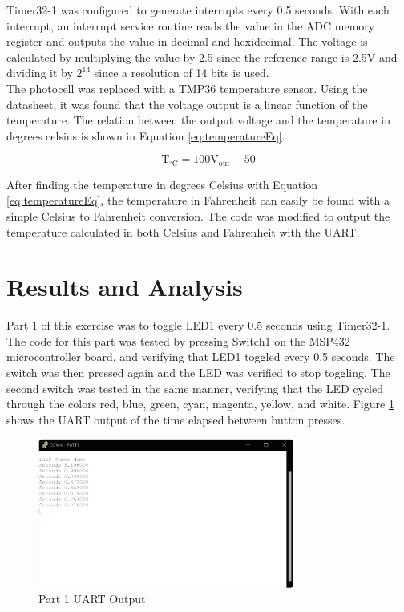 \documentclass[CMPE]{KGCOEReport}
\begin{document}
Timer32-1 was configured to generate interrupts every 0.5 seconds. With each interrupt, an interrupt service routine reads the value in the ADC memory register and outputs the value in decimal and hexidecimal. The voltage is calculated by multiplying the value by 2.5 since the reference range is 2.5V and dividing it by $2^{14}$ since a resolution of 14 bits is used. \\

The photocell was replaced with a TMP36 temperature sensor. Using the datasheet, it was found that the voltage output is a linear function of the temperature. The relation between the output voltage and the temperature in degrees celsius is shown in Equation \ref{eq:temperatureEq}.

\begin{equation}
\text{T}_{^\circ\text{C}} = 100\text{V}_\text{out} - 50
\label{eq:temperatureEq}
\end{equation}

After finding the temperature in degrees Celsius with Equation \ref{eq:temperatureEq}, the temperature in Fahrenheit can easily be found with a simple Celsius to Fahrenheit conversion. The code was modified to output the temperature calculated in both Celsius and Fahrenheit with the UART.

\section*{Results and Analysis}

Part 1 of this exercise was to toggle LED1 every 0.5 seconds using Timer32-1. The code for this part was tested by pressing Switch1 on the MSP432 microcontroller board, and verifying that LED1 toggled every 0.5 seconds. The switch was then pressed again and the LED was verified to stop toggling. The second switch was tested in the same manner, verifying that the LED cycled through the colors red, blue, green, cyan, magenta, yellow, and white. Figure \ref{fig:part1} shows the UART output of the time elapsed between button presses.

\begin{figure}[H]
    \centering
    \includegraphics[width=0.75\textwidth]{part1.png}
    \caption{Part 1 UART Output}
    \label{fig:part1}
\end{figure}
\end{document}
